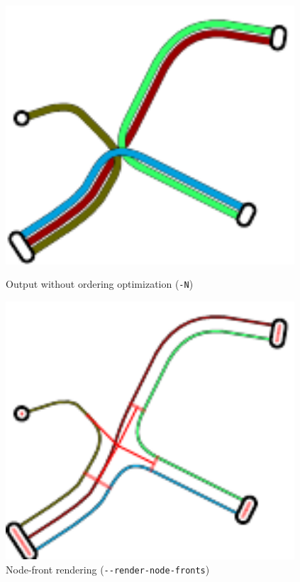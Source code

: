 \documentclass[10pt,a4paper]{article}
\begin{document}
\begin{figure}
  \centering
	\begin{minipage}[b]{0.4\textwidth}
\includegraphics[width=0.96\textwidth]{test2_noopt.pdf}
	\caption{Output without ordering optimization (\texttt{-N})}
  \label{wooptim}
	\end{minipage}
	\hspace{10mm}
	\begin{minipage}[b]{0.4\textwidth}
\includegraphics[width=0.96\textwidth]{test2_nodefronts.pdf}
	\caption{Node-front rendering (\texttt{-{}-render-node-fronts})}
  \label{nodefronts}
	\end{minipage}
\end{figure}
\end{document}
